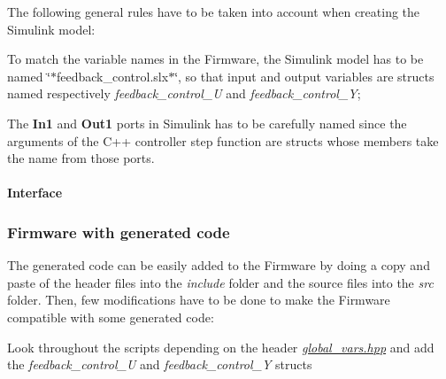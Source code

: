 The following general rules have to be taken into account when creating the Simulink model\+:
\begin{DoxyItemize}
\item To match the variable names in the Firmware, the Simulink model has to be named \char`\"{}$\ast$feedback\+\_\+control.\+slx$\ast$\char`\"{}, so that input and output variables are structs named respectively {\itshape feedback\+\_\+control\+\_\+U} and {\itshape feedback\+\_\+control\+\_\+Y};
\item The {\bfseries In1} and {\bfseries Out1} ports in Simulink has to be carefully named since the arguments of the C++ controller step function are structs whose members take the name from those ports. \paragraph*{Interface}
\end{DoxyItemize}

\subsubsection*{Firmware with generated code}

The generated code can be easily added to the Firmware by doing a copy and paste of the header files into the {\itshape include} folder and the source files into the {\itshape src} folder. Then, few modifications have to be done to make the Firmware compatible with some generated code\+:
\begin{DoxyItemize}
\item Look throughout the scripts depending on the header {\itshape \hyperlink{global__vars_8hpp}{global\+\_\+vars.\+hpp}} and add the {\itshape feedback\+\_\+control\+\_\+U} and {\itshape feedback\+\_\+control\+\_\+Y} structs 
\end{DoxyItemize}